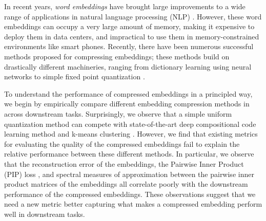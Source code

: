 In recent years, \textit{word embeddings} \citep{word2vec13,glove14,fasttext18} have brought large improvements to a wide range of applications in natural language processing (NLP) \citep{collins16,drqa17}.
However, these word embeddings can occupy a very large amount of memory, making it expensive to deploy them in data centers, and impractical to use them in memory-constrained environments like smart phones.
Recently, there have been numerous successful methods proposed for compressing embeddings; these methods build on drastically different machineries, ranging from dictionary learning \citep{sparse16,dccl17,kway18} using neural networks to simple fixed point quantization \citep{lam2018word2bits,andrews16}. %

To understand the performance of compressed embeddings in a principled way, we begin by empirically compare different embedding compression methods in across downstream tasks. 
Surprisingly, we observe that a simple uniform quantization method can compete with state-of-the-art deep compositional code learning method \citep{dccl17} and k-means clustering \citep{andrews16}. 
However, we find that existing metrics for evaluating the quality of the compressed embeddings fail to explain the relative performance between these different methods.
In particular, we observe that the reconstruction error of the embeddings, the Pairwise Inner Product (PIP) loss \citep{yin18}, and spectral measures of approximation between the pairwise inner product matrices of the embeddings \citep{avron17,lprff18} all correlate poorly with the downstream performance of the compressed embeddings. 
These observations suggest that we need a new metric better capturing what makes a compressed embedding perform well in downstream tasks.

